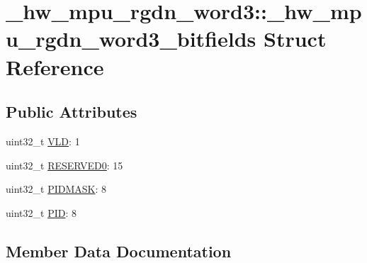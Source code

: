 \hypertarget{struct__hw__mpu__rgdn__word3_1_1__hw__mpu__rgdn__word3__bitfields}{}\section{\+\_\+hw\+\_\+mpu\+\_\+rgdn\+\_\+word3\+:\+:\+\_\+hw\+\_\+mpu\+\_\+rgdn\+\_\+word3\+\_\+bitfields Struct Reference}
\label{struct__hw__mpu__rgdn__word3_1_1__hw__mpu__rgdn__word3__bitfields}
\subsection*{Public Attributes}
\begin{DoxyCompactItemize}
\item 
uint32\+\_\+t \hyperlink{struct__hw__mpu__rgdn__word3_1_1__hw__mpu__rgdn__word3__bitfields_ad834bb6b45b75db860f69670046ab55f}{V\+LD}\+: 1
\item 
uint32\+\_\+t \hyperlink{struct__hw__mpu__rgdn__word3_1_1__hw__mpu__rgdn__word3__bitfields_a5523e1d7a6ff7b0dc9e93bd4c95cda5f}{R\+E\+S\+E\+R\+V\+E\+D0}\+: 15
\item 
uint32\+\_\+t \hyperlink{struct__hw__mpu__rgdn__word3_1_1__hw__mpu__rgdn__word3__bitfields_a11658f61414300a988a1937a387322bc}{P\+I\+D\+M\+A\+SK}\+: 8
\item 
uint32\+\_\+t \hyperlink{struct__hw__mpu__rgdn__word3_1_1__hw__mpu__rgdn__word3__bitfields_ae849bc84c2ee10644c69e87300294c78}{P\+ID}\+: 8
\end{DoxyCompactItemize}


\subsection{Member Data Documentation}

